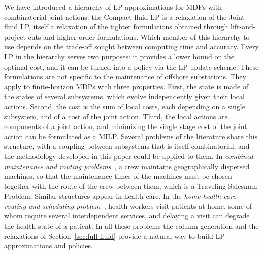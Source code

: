 \documentclass{article}
\begin{document}
We have introduced a hierarchy of LP approximations for MDPs with combinatorial joint actions:
the Compact fluid LP is a relaxation of the Joint fluid LP, itself a relaxation of the tighter formulations
obtained through lift-and-project cuts and higher-order formulations. Which
member of this hierarchy to use depends on the trade-off sought between computing time and accuracy. Every LP
in the hierarchy serves two purposes: it provides a lower bound on the optimal cost, and it can be turned into
a policy via the LP-update scheme. These formulations are not specific to the maintenance of offshore substations. They apply to finite-horizon MDPs
with three properties. First, the state is made of the states of several subsystems, which evolve independently given
their local actions. Second, the cost is the sum of local costs, each depending on a single subsystem, and of a cost of
the joint action. Third, the local actions are components of a joint action, and minimizing the single stage cost of the joint
action can be formulated as a MILP. Several problems of the literature share this structure, with a
coupling between subsystems that is itself combinatorial, and the methodology developed in this paper could be applied
to them. In \emph{combined maintenance and routing problems}~\cite{LopezSantana2016, lopezsantana2023}, a crew
maintains geographically dispersed machines, so that the maintenance times of the machines must be chosen together
with the route of the crew between them, which is a Traveling Salesman Problem. Similar structures appear in
health care. In the \emph{home health care routing and scheduling problem}~\cite{Mankowska2014, rekabi2024home}, health
workers visit patients at home, some of whom require several interdependent services, and delaying a visit can
degrade the health state of a patient. In all these problems the
column generation and the relaxations of Section~\ref{sec:full-fluid} provide a natural way to build LP approximations
and policies.
\end{document}

